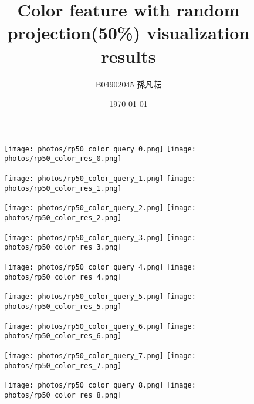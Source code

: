 \documentclass{article}
\begin{document}
\title{Color feature with random projection(50\%) visualization results}
\author{B04902045 孫凡耘}
\date{\today}
\maketitle

\begin{figure}[!ht]
\centering
\texttt{[image: photos/rp50\_color\_query\_0.png]}
\texttt{[image: photos/rp50\_color\_res\_0.png]}
\end{figure}

\begin{figure}[!ht]
\centering
\texttt{[image: photos/rp50\_color\_query\_1.png]}
\texttt{[image: photos/rp50\_color\_res\_1.png]}
\end{figure}

\begin{figure}[!ht]
\centering
\texttt{[image: photos/rp50\_color\_query\_2.png]}
\texttt{[image: photos/rp50\_color\_res\_2.png]}
\end{figure}

\begin{figure}[!ht]
\centering
\texttt{[image: photos/rp50\_color\_query\_3.png]}
\texttt{[image: photos/rp50\_color\_res\_3.png]}
\end{figure}

\begin{figure}[!ht]
\centering
\texttt{[image: photos/rp50\_color\_query\_4.png]}
\texttt{[image: photos/rp50\_color\_res\_4.png]}
\end{figure}

\begin{figure}[!ht]
\centering
\texttt{[image: photos/rp50\_color\_query\_5.png]}
\texttt{[image: photos/rp50\_color\_res\_5.png]}
\end{figure}

\begin{figure}[!ht]
\centering
\texttt{[image: photos/rp50\_color\_query\_6.png]}
\texttt{[image: photos/rp50\_color\_res\_6.png]}
\end{figure}

\begin{figure}[!ht]
\centering
\texttt{[image: photos/rp50\_color\_query\_7.png]}
\texttt{[image: photos/rp50\_color\_res\_7.png]}
\end{figure}

\begin{figure}[!ht]
\centering
\texttt{[image: photos/rp50\_color\_query\_8.png]}
\texttt{[image: photos/rp50\_color\_res\_8.png]}
\end{figure}
\end{document}
